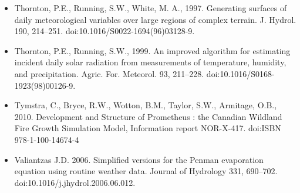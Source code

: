 \documentclass[11pt,a4paper]{article}
\begin{document}
\begin{itemize}
\item{Thornton, P.E., Running, S.W., White, M. A., 1997. Generating surfaces of daily meteorological variables over large regions of complex terrain. J. Hydrol. 190, 214–251. doi:10.1016/S0022-1694(96)03128-9.}

\item{Thornton, P.E., Running, S.W., 1999. An improved algorithm for estimating incident daily solar radiation from measurements of temperature, humidity, and precipitation. Agric. For. Meteorol. 93, 211–228. doi:10.1016/S0168-1923(98)00126-9.}

\item{Tymstra, C., Bryce, R.W., Wotton, B.M., Taylor, S.W., Armitage, O.B., 2010. Development and Structure of Prometheus : the Canadian Wildland Fire Growth Simulation Model, Information report NOR-X-417. doi:ISBN 978-1-100-14674-4}

\item{Valiantzas J.D. 2006. Simplified versions for the Penman evaporation equation using routine weather data. Journal of Hydrology 331, 690–702. doi:10.1016/j.jhydrol.2006.06.012.}
\end{itemize}
\end{document}
